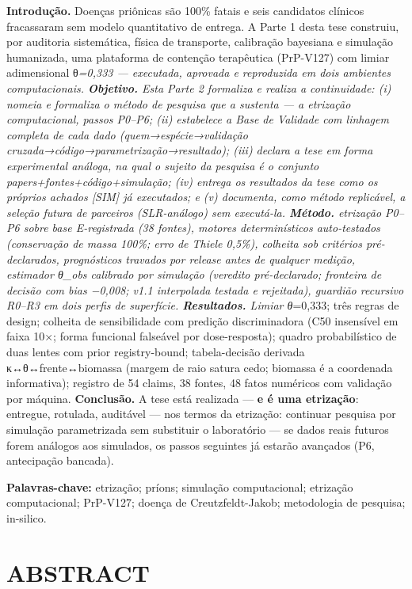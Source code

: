 \documentclass[
  12pt,
]{report}
\begin{document}
\textbf{Introdução.} Doenças priônicas são 100\% fatais e seis
candidatos clínicos fracassaram sem modelo quantitativo de entrega. A
Parte 1 desta tese construiu, por auditoria sistemática, física de
transporte, calibração bayesiana e simulação humanizada, uma plataforma
de contenção terapêutica (PrP-V127) com limiar adimensional
θ\emph{=0,333 --- executada, aprovada e reproduzida em dois ambientes
computacionais. \textbf{Objetivo.} Esta Parte 2 formaliza e realiza a
continuidade: (i) nomeia e formaliza o método de pesquisa que a sustenta
--- a etrização computacional, passos P0--P6; (ii) estabelece a Base de
Validade com linhagem completa de cada dado (quem→espécie→validação
cruzada→código→parametrização→resultado); (iii) declara a tese em forma
experimental análoga, na qual o sujeito da pesquisa é o conjunto
papers+fontes+código+simulação; (iv) entrega os resultados da tese como
os próprios achados {[}SIM{]} já executados; e (v) documenta, como
método replicável, a seleção futura de parceiros (SLR-análogo) sem
executá-la. \textbf{Método.} etrização P0--P6 sobre base E-registrada
(38 fontes), motores determinísticos auto-testados (conservação de massa
100\%; erro de Thiele 0,5\%), colheita sob critérios pré-declarados,
prognósticos travados por release antes de qualquer medição, estimador
θ\_obs calibrado por simulação (veredito pré-declarado; fronteira de
decisão com bias −0,008; v1.1 interpolada testada e rejeitada), guardião
recursivo R0--R3 em dois perfis de superfície. \textbf{Resultados.}
Limiar θ}=0,333; três regras de design; colheita de sensibilidade com
predição discriminadora (C50 insensível em faixa 10×; forma funcional
falseável por dose-resposta); quadro probabilístico de duas lentes com
prior registry-bound; tabela-decisão derivada κ↔θ↔frente↔biomassa
(margem de raio satura cedo; biomassa é a coordenada informativa);
registro de 54 claims, 38 fontes, 48 fatos numéricos com validação por
máquina. \textbf{Conclusão.} A tese está realizada --- \textbf{e é uma
etrização}: entregue, rotulada, auditável --- nos termos da etrização:
continuar pesquisa por simulação parametrizada sem substituir o
laboratório --- se dados reais futuros forem análogos aos simulados, os
passos seguintes já estarão avançados (P6, antecipação bancada).

\textbf{Palavras-chave:} etrização; príons; simulação computacional;
etrização computacional; PrP-V127; doença de Creutzfeldt-Jakob;
metodologia de pesquisa; in-silico.

\hypertarget{abstract}{%
\section{ABSTRACT}\label{abstract}}
\end{document}
